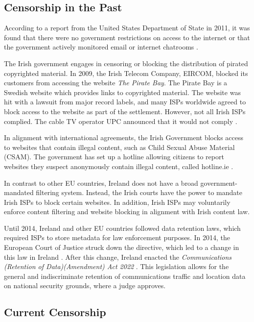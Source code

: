 \subsection{Censorship in the Past}

According to a report from the United States Department of State in 2011, it was found that there were no government restrictions on access to the internet or that the government actively monitored email or internet chatrooms \cite{stateTechnicalDifficulties}.

The Irish government engages in censoring or blocking the distribution of pirated copyrighted material. In 2009, the Irish Telecom Company, EIRCOM, blocked its customers from accessing the website \textit{The Pirate Bay}. The Pirate Bay is a Swedish website which provides links to copyrighted material. The website was hit with a lawsuit from major record labels, and many ISPs worldwide agreed to block access to the website as part of the settlement. However, not all Irish ISPs complied. The cable TV operator UPC announced that it would not comply \cite{irishtimesEircomBlock}. 

In alignment with international agreements, the Irish Government blocks access to websites that contain illegal content, such as Child Sexual Abuse Material (CSAM). The government has set up a hotline allowing citizens to report websites they suspect anonymously contain illegal content, called hotline.ie \cite{hotlineAboutx2013}.

In contrast to other EU countries, Ireland does not have a broad government-mandated filtering system. Instead, the Irish courts have the power to mandate Irish ISPs to block certain websites. In addition, Irish ISPs may voluntarily enforce content filtering and website blocking in alignment with Irish content law.

Until 2014, Ireland and other EU countries followed data retention laws, which required ISPs to store metadata for law enforcement purposes. In 2014, the European Court of Justice struck down the directive, which led to a change in this law in Ireland \cite{DataRetentionInvalid2014}. After this change, Ireland enacted the \textit{Communications (Retention of Data)(Amendment) Act 2022} \cite{irishlegalDataRetention}. This legislation allows for the general and indiscriminate retention of communications traffic and location data on national security grounds, where a judge approves.

\subsection{Current Censorship}

